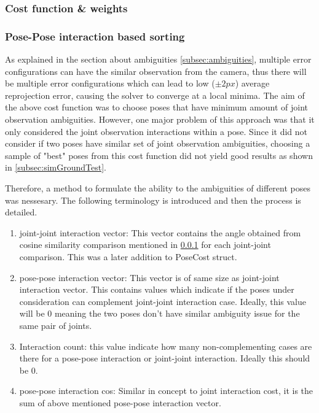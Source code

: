 \documentclass[english, printversion, nomenclature, notitle]{tuvisionthesis} %
\begin{document}
\subsubsection{Cost function \& weights}
\label{subsec:costFunc}


\subsubsection{Pose-Pose interaction based sorting}
\label{subsec:posepose}

As explained in the section about ambiguities \cref{subsec:ambiguities}, multiple error configurations can have the similar observation from the camera, thus there will be multiple error configurations which can lead to low ($\pm2px$) average reprojection error, causing the solver to converge at a local minima. The aim of the above cost function was to choose poses that have minimum amount of joint observation ambiguities. However, one major problem of this approach was that it only considered the joint observation interactions within a pose. Since it did not consider if two poses have similar set of joint observation ambiguities, choosing a sample of "best" poses from this cost function did not yield good results as shown in \cref{subsec:simGroundTest}.

Therefore, a method to formulate the ability to the ambiguities of different poses was nessesary. The following terminology is introduced and then the process is detailed.
 
 \begin{enumerate}
 	\item joint-joint interaction vector: This vector contains the angle obtained from cosine similarity comparison mentioned in \cref{subsec:costFunc} for each joint-joint comparison. This was a later addition to PoseCost struct.
 	\item pose-pose interaction vector: This vector is of same size as joint-joint interaction vector. This contains values which indicate if the poses under consideration can complement joint-joint interaction case. Ideally, this value will be 0 meaning the two poses don't have similar ambiguity issue for the same pair of joints.
 	\item Interaction count: this value indicate how many non-complementing cases are there for a pose-pose interaction or joint-joint interaction. Ideally this should be 0.
 	\item pose-pose interaction cos: Similar in concept to joint interaction cost, it is the sum of above mentioned pose-pose interaction vector.
 \end{enumerate}
\end{document}
